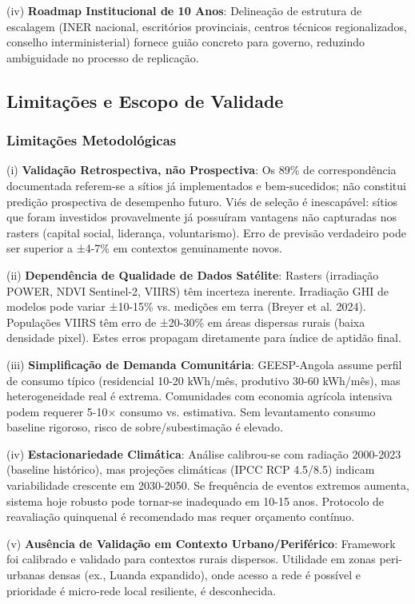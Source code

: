 \documentclass[12pt, a4paper]{article}
\begin{document}
(iv) \textbf{Roadmap Institucional de 10 Anos}: Delineação de estrutura de escalagem (INER nacional, escritórios provinciais, centros técnicos regionalizados, conselho interministerial) fornece guião concreto para governo, reduzindo ambiguidade no processo de replicação.

\subsection{Limitações e Escopo de Validade}

\subsubsection{Limitações Metodológicas}

(i) \textbf{Validação Retrospectiva, não Prospectiva}: Os 89\% de correspondência documentada referem-se a sítios já implementados e bem-sucedidos; não constitui predição prospectiva de desempenho futuro. Viés de seleção é inescapável: sítios que foram investidos provavelmente já possuíram vantagens não capturadas nos rasters (capital social, liderança, voluntarismo). Erro de previsão verdadeiro pode ser superior a ±4-7\% em contextos genuinamente novos.

(ii) \textbf{Dependência de Qualidade de Dados Satélite}: Rasters (irradiação POWER, NDVI Sentinel-2, VIIRS) têm incerteza inerente. Irradiação GHI de modelos pode variar ±10-15\% vs. medições em terra (Breyer et al. 2024). Populações VIIRS têm erro de ±20-30\% em áreas dispersas rurais (baixa densidade pixel). Estes erros propagam diretamente para índice de aptidão final.

(iii) \textbf{Simplificação de Demanda Comunitária}: GEESP-Angola assume perfil de consumo típico (residencial 10-20 kWh/mês, produtivo 30-60 kWh/mês), mas heterogeneidade real é extrema. Comunidades com economia agrícola intensiva podem requerer 5-10× consumo vs. estimativa. Sem levantamento consumo baseline rigoroso, risco de sobre/subestimação é elevado.

(iv) \textbf{Estacionariedade Climática}: Análise calibrou-se com radiação 2000-2023 (baseline histórico), mas projeções climáticas (IPCC RCP 4.5/8.5) indicam variabilidade crescente em 2030-2050. Se frequência de eventos extremos aumenta, sistema hoje robusto pode tornar-se inadequado em 10-15 anos. Protocolo de reavaliação quinquenal é recomendado mas requer orçamento contínuo.

(v) \textbf{Ausência de Validação em Contexto Urbano/Periférico}: Framework foi calibrado e validado para contextos rurais dispersos. Utilidade em zonas peri-urbanas densas (ex., Luanda expandido), onde acesso a rede é possível e prioridade é micro-rede local resiliente, é desconhecida.
\end{document}
